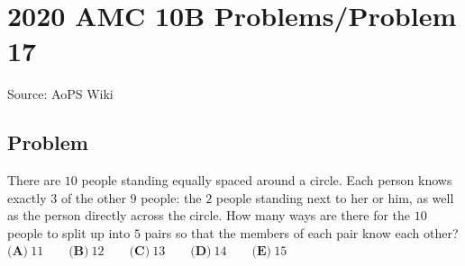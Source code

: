 \documentclass[12pt]{article}
\begin{document}
\section*{{2020 AMC 10B Problems/Problem 17}}
Source: AoPS Wiki

\subsection*{Problem}
There are $10$ people standing equally spaced around a circle. Each person knows exactly $3$ of the other $9$ people: the $2$ people standing next to her or him, as well as the person directly across the circle. How many ways are there for the $10$ people to split up into $5$ pairs so that the members of each pair know each other? $\textbf{(A)}\ 11 \qquad\textbf{(B)}\ 12 \qquad\textbf{(C)}\ 13 \qquad\textbf{(D)}\ 14 \qquad\textbf{(E)}\ 15$
\end{document}
